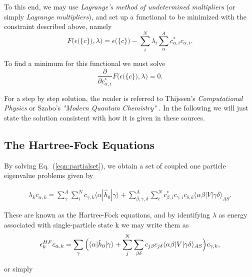 To this end, we may use \emph{Lagrange's method of undetermined  multipliers} \cite[p.116]{Szabo} 
(or simply \emph{Lagrange  multipliers}), and set up a functional to be minimized with the
constraint described above, namely
\begin{equation}
 F\big( \epsilon \big( \{c\} \big), \lambda \big) =  \epsilon \big( \{c\} \big) - \sum _i^N \lambda _i \sum _{\alpha}^A c_{\alpha,i}^{*} c_{\alpha,i}.
 \label{lagrange_minim}
\end{equation}

To find a minimum for this functional we must solve
\begin{equation}
\frac{\partial}{\partial c_{\alpha,i}^{*}} F\big(  \epsilon \big( \{c\} \big), \lambda \big) = 0.
\label{eqn:partialset}
\end{equation}

For a step by step solution, the reader is referred to Thijssen's
\emph{Computational Physics} \cite{Thijssen} or Szabo's \emph{"Modern Quantum Chemistry"} \cite{Szabo}. 
In the following we will just
state the solution consistent with how it is given in these sources.

\subsection{The Hartree-Fock Equations}

By solving Eq.~(\ref{eqn:partialset}), we obtain a set of coupled one particle eigenvalue problems given by

\begin{multline}
\lambda _k c_{\alpha,k} =  
\sum _{\gamma}^A\sum _{i}^N c_{\gamma,k}\langle \alpha |\hat{h}_0| \gamma \rangle + 
\sum _{\beta,\gamma,\delta}^A \sum _i^N c_{\beta,i}^{*}c_{\gamma,i}c_{\delta,k}\langle \alpha \beta | V |\gamma \delta \rangle_{AS}.
 \label{eqn:HF1}
\end{multline}

These are known as the Hartree-Fock equations, and by identifying $\lambda$ as energy associated with single-particle state k \cite{hh4480} we may write them as
\begin{equation}
\epsilon_k^{HF} c_{\alpha,k} =  
\sum_{\gamma} \Big{(}  {\langle \alpha |\hat{h}_0 | \gamma \rangle + 
\sum_j^N \sum_{\beta \delta}{c_{j \beta} c_{j \delta}  \langle \alpha \beta | V | \gamma \delta \rangle_{AS} } } \Big{)} c_{ \gamma, k},
 \label{eqn:HF2}
\end{equation}

or simply 

